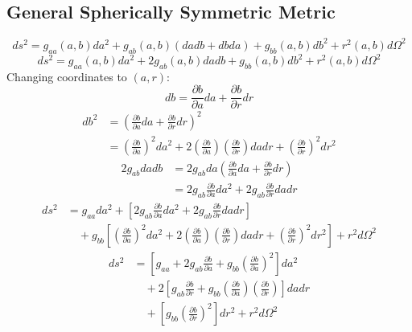 \documentclass[11pt, a4paper]{report}
\begin{document}
\subsection{General Spherically Symmetric Metric}
\begin{equation}
ds^{2}=g_{aa}(a,b)da^{2}+g_{ab}(a,b)(da db+db da)+g_{bb}(a,b)db^{2}+r^{2}(a,b)d\Omega^{2}
\end{equation}
\begin{equation}
ds^{2}=g_{aa}(a,b)da^{2}+2g_{ab}(a,b)da db+g_{bb}(a,b)db^{2}+r^{2}(a,b)d\Omega^{2}
\end{equation}
Changing coordinates to $(a,r)$:
\begin{equation}
db = \frac{\partial b}{\partial a} da + \frac{\partial b}{\partial r} dr
\end{equation}
\begin{align}
db^2 &= \left( \frac{\partial b}{\partial a} da + \frac{\partial b}{\partial r} dr \right)^2 \nonumber \\
&= \left( \frac{\partial b}{\partial a} \right)^2 da^2 + 2 \left( \frac{\partial b}{\partial a} \right) \left( \frac{\partial b}{\partial r} \right) da dr + \left( \frac{\partial b}{\partial r} \right)^2 dr^2
\end{align}
\begin{align}
2g_{ab} da db &= 2g_{ab} da \left( \frac{\partial b}{\partial a} da + \frac{\partial b}{\partial r} dr \right) \nonumber \\
&= 2g_{ab} \frac{\partial b}{\partial a} da^2 + 2g_{ab} \frac{\partial b}{\partial r} da dr
\end{align}
\begin{align}
ds^{2} &= g_{aa} da^{2} + \left[ 2g_{ab} \frac{\partial b}{\partial a} da^2 + 2g_{ab} \frac{\partial b}{\partial r} da dr \right] \nonumber \\
&\quad + g_{bb} \left[ \left( \frac{\partial b}{\partial a} \right)^2 da^2 + 2 \left( \frac{\partial b}{\partial a} \right) \left( \frac{\partial b}{\partial r} \right) da dr + \left( \frac{\partial b}{\partial r} \right)^2 dr^2 \right] + r^{2}d\Omega^{2}
\end{align}
\begin{align}
ds^{2} &= \left[ g_{aa} + 2g_{ab} \frac{\partial b}{\partial a} + g_{bb} \left( \frac{\partial b}{\partial a} \right)^2 \right] da^{2} \nonumber \\
&\quad + 2 \left[ g_{ab} \frac{\partial b}{\partial r} + g_{bb} \left( \frac{\partial b}{\partial a} \right) \left( \frac{\partial b}{\partial r} \right) \right] da dr \nonumber \\
&\quad + \left[ g_{bb} \left( \frac{\partial b}{\partial r} \right)^2 \right] dr^{2} + r^{2}d\Omega^{2}
\end{align}
\end{document}
